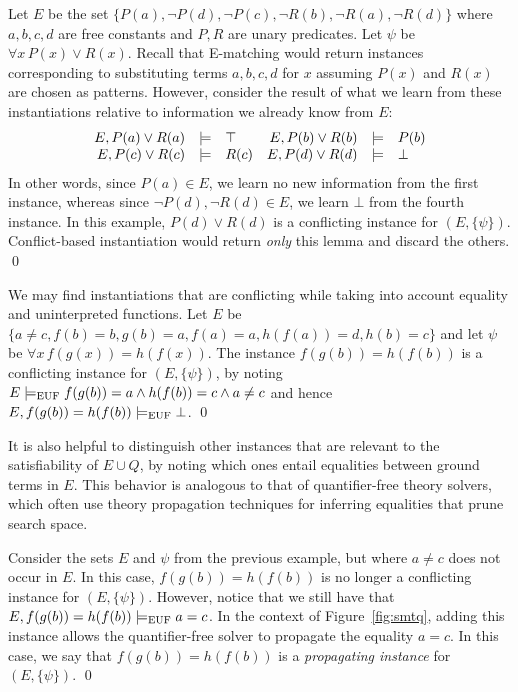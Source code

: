 \documentclass[oribibl]{llncs}
\begin{document}
\begin{example}
Let $E$ be the set $\{ P(a), \neg P(d), \neg P( c ), \neg R(b), \neg R(a), \neg R(d) \}$ where $a,b,c,d$ are free constants and $P,R$ are unary predicates.
Let $\psi$ be $\forall x\, P( x ) \vee R( x )$.
Recall that E-matching would return instances corresponding to substituting terms $a,b,c,d$ for $x$
assuming $P( x )$ and $R( x )$ are chosen as patterns.
However, consider the result of what we learn from these instantiations relative to information we already know from $E$:
\[
\begin{array}{rcl@{\hspace{1em}}rcl}
E, P( a ) \vee R( a ) &\models& \top &
E, P( b ) \vee R( b ) &\models& P( b ) \\
E, P( c ) \vee R( c ) &\models& R( c ) &
E, P( d ) \vee R( d ) &\models& \bot \\
\end{array}
\]
In other words, since $P( a ) \in E$, we learn no new information from the first instance,
whereas since $\neg P( d ), \neg R( d ) \in E$, we learn $\bot$ from the fourth instance.
In this example, $P( d ) \vee R( d )$ is a conflicting instance for $( E, \{ \psi \} )$.
Conflict-based instantiation would return \emph{only} this lemma and discard the others.
\qed
\end{example}
\begin{example}
We may find instantiations that are conflicting while taking into account equality and uninterpreted functions.
Let $E$ be $\{ a \neq c, f( b ) = b, g( b ) = a, f( a ) = a, h( f( a ) ) = d, h( b ) =c \}$ and let $\psi$ be
$\forall x\, f( g( x ) ) = h( f( x ) )$. 
The instance $f( g( b ) ) = h( f( b ) )$ is a conflicting instance for $( E, \{ \psi \} )$,
by noting
$E \models_\mathrm{EUF} f( g( b ) ) = a \wedge h( f( b ) ) = c \wedge a \neq c$
and hence $E, f( g( b ) ) = h( f( b ) ) \models_\mathrm{EUF} \bot$.
\qed
\end{example}
It is also helpful to distinguish other instances that are relevant to the satisfiability of $E \cup Q$,
by noting which ones entail equalities between ground terms in $E$.
This behavior is analogous to that of quantifier-free theory solvers, which often use
theory propagation techniques for inferring equalities that prune search space.
\begin{example}
Consider the sets $E$ and $\psi$ from the previous example, but where $a \neq c$ does not occur in $E$.
In this case, $f( g( b ) ) = h( f( b ) )$ is no longer a conflicting instance for $( E, \{ \psi \} )$.
However, notice that we still have that $E, f( g( b ) ) = h( f( b ) ) \models_\mathrm{EUF} a = c$.
In the context of Figure~\ref{fig:smtq}, 
adding this instance allows the quantifier-free solver to propagate the equality $a = c$.
In this case, we say that $f( g( b ) ) = h( f( b ) )$ is a \emph{propagating instance} for $( E, \{ \psi \} )$.
\qed
\end{example}
\end{document}
